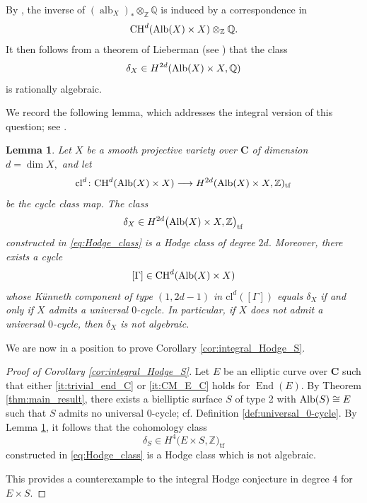 \documentclass[11pt,letterpaper]{amsart}
\newcommand{\Alb}{\textnormal{Alb}}
\newcommand{\CH}{\textnormal{CH}}
\numberwithin{equation}{section}
\newtheorem{lemma}[theorem]{Lemma}
\theoremstyle{definition}
\theoremstyle{remark}
\newcommand{\Q}{\mathbb{Q}}
\newcommand{\Z}{\mathbb{Z}}
\newcommand{\bbC}{\mathbf{C}}
\newcommand{\cl}{\text{cl}}
\DeclareMathOperator{\al}{alb}
\DeclareMathOperator{\End}{End}
\begin{document}
By \cite[Corollary 1.6.3]{Murre}, the inverse of $(\al_{X})_{\ast}\otimes_{\Z}\Q$ is induced by a correspondence in $$\CH^{d}(\Alb(X)\times X)\otimes_{\Z}\Q.$$ It then follows from a theorem of Lieberman (see \cite[Theorem 2A11.]{Kleiman1968}) that the class $$\delta_{X}\in H^{2d}(\Alb(X)\times X,\Q)$$ is rationally algebraic.\par

We record the following lemma, which addresses the integral version of this question; see \cite[\S 2]{voisin_a}.

\begin{lemma}\label{lem:int_Hodge_conj_vs_uni_0_cycl}Let $X$ be a smooth projective variety over $\bbC$ of dimension $d = \dim X,$ and let $$\cl^d\colon\CH^{d}(\Alb(X)\times X)\longrightarrow H^{2d}(\Alb(X)\times X,\Z)_{\mathrm{tf}}$$ be the cycle class map. The class $$\delta_{X}\in H^{2d}\bigl(\Alb(X)\times X,\Z\bigr)_{\mathrm{tf}}$$ constructed in \eqref{eq:Hodge_class} is a Hodge class of degree $2d.$ Moreover, there exists a cycle $$[\Gamma]\in\CH^{d}(\Alb(X)\times X)$$ whose Künneth component of type $(1,2d-1)$ in $\cl^{d}([\Gamma])$ equals $\delta_X$ if and only if $X$ admits a universal $0$-cycle. In particular, if $X$ does not admit a universal $0$-cycle, then $\delta_{X}$ is not algebraic.
\end{lemma}
We are now in a position to prove Corollary \ref{cor:integral_Hodge_S}.

\begin{proof}[Proof of Corollary \ref{cor:integral_Hodge_S}]Let $E$ be an elliptic curve over $\bbC$ such that either \ref{it:trivial_end_C} or \ref{it:CM_E_C} holds for $\End(E)$. 
By Theorem \ref{thm:main_result}, there exists a bielliptic surface $S$ of type 2 with $\Alb(S)\cong E$ such that $S$ admits no universal $0$-cycle; cf. Definition \ref{def:universal_0-cycle}.
By Lemma \ref{lem:int_Hodge_conj_vs_uni_0_cycl}, it follows that the cohomology class $$\delta_{S}\in H^{4}\bigl(E\times S,\Z\bigr)_{\mathrm{tf}}$$ constructed in \eqref{eq:Hodge_class} is a Hodge class which is not algebraic.\par
This provides a counterexample to the integral Hodge conjecture in degree $4$
for $E\times S$.\end{proof}
\end{document}

